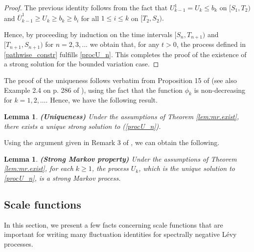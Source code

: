 \documentclass[12pt,reqno]{amsart}
\newtheorem{lemma}[theorem]{Lemma}
\theoremstyle{definition}
\theoremstyle{remark}
\begin{document}
\begin{proof}
		The previous identity follows from the fact that $U^1_{k-1} = U_k \leq b_k$ on $[S_1,T_2)$ and $\overline{U}^1_{k-1} \geq U_k \geq b_k \geq b_i$ for all $1 \leq i \leq k$ on $[T_2, S_2).$
				
		Hence, by proceeding by induction on the time intervals $[S_n, T_{n+1})$ and $[T_{n+1}, S_{n+1})$ for $n=2,3,...$ we obtain that, for any $t>0$,
		the process defined in \eqref{pathwise_constr} fulfills \eqref{procU_n}. This completes the proof of the existence of a strong solution for the bounded variation case.
		\end{proof}

		The proof of the uniqueness follows verbatim from Proposition 15 of \cite{kyprianouloeffen2010} (see also Example 2.4 on
p. 286 of \cite{karatzas91}), using the fact that the function $\phi_k$ is non-decreasing for $k=1,2,\dots$. 
 Hence, we have the following result.

		\begin{lemma} \textbf{(Uniqueness)} \label{lemma_uniqueness}
Under the assumptions of Theorem \ref{lem:mr.exist}, there exists a unique strong solution to (\ref{procU_n}).
\end{lemma}

Using the argument given in Remark 3 of \cite{kyprianouloeffen2010}, we can obtain the following.

			\begin{lemma} \textbf{(Strong Markov property)} 
			Under the assumptions of Theorem \ref{lem:mr.exist}, for each $k\geq1$, the process $U_k$, which is the unique solution to \eqref{procU_n}, is a strong Markov process.
			\end{lemma}
					


\subsection{Scale functions}\label{sec:scale}
In this section, we present a few facts concerning scale functions that are important for writing many fluctuation identities for 
spectrally negative L\'evy processes.
\end{document}
